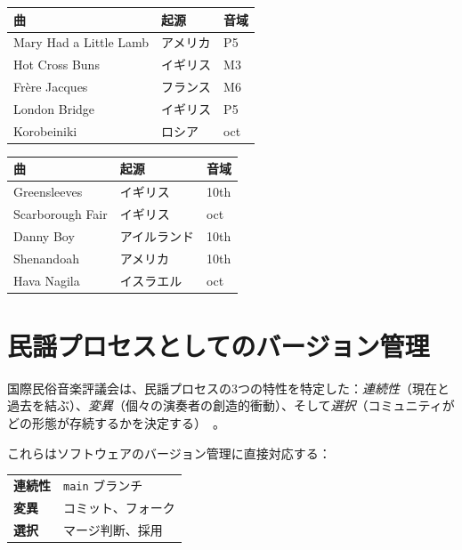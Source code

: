 \documentclass[11pt]{article}
\begin{document}
\begin{card}
\begin{tabularx}{\linewidth}{Xll}
\toprule
\textbf{曲} & \textbf{起源} & \textbf{音域} \\
\midrule
Mary Had a Little Lamb & アメリカ & P5 \\
Hot Cross Buns & イギリス & M3 \\
Fr\`ere Jacques & フランス & M6 \\
London Bridge & イギリス & P5 \\
Korobeiniki & ロシア & oct \\
\bottomrule
\end{tabularx}
\end{card}

\begin{card}
\begin{tabularx}{\linewidth}{Xll}
\toprule
\textbf{曲} & \textbf{起源} & \textbf{音域} \\
\midrule
Greensleeves & イギリス & 10th \\
Scarborough Fair & イギリス & oct \\
Danny Boy & アイルランド & 10th \\
Shenandoah & アメリカ & 10th \\
Hava Nagila & イスラエル & oct \\
\bottomrule
\end{tabularx}
\end{card}

\section{民謡プロセスとしてのバージョン管理}

国際民俗音楽評議会は、民謡プロセスの3つの特性を特定した：\emph{連続性}（現在と過去を結ぶ）、\emph{変異}（個々の演奏者の創造的衝動）、そして\emph{選択}（コミュニティがどの形態が存続するかを決定する）~\citep{karpeles1955definition}。

\begin{accentcard}
これらはソフトウェアのバージョン管理に直接対応する：

\vspace{0.3em}
\begin{tabularx}{\linewidth}{lX}
\textbf{連続性} & \texttt{main} ブランチ \\
\textbf{変異} & コミット、フォーク \\
\textbf{選択} & マージ判断、採用 \\
\end{tabularx}
\end{accentcard}
\end{document}
